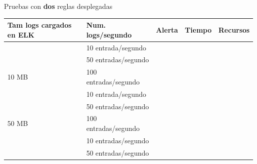 Pruebas con \textbf{dos} reglas desplegadas

\begin{table}[H]
\begin{tabular}{|l|l|l|l|l|}
\hline
\rowcolor[HTML]{ECF4FF} 
{\color[HTML]{000000} \textbf{Tam logs cargados en ELK}} & {\color[HTML]{000000} \textbf{Num. logs/segundo}} & {\color[HTML]{000000} \textbf{Alerta}} & {\color[HTML]{000000} \textbf{Tiempo}} & {\color[HTML]{000000} \textbf{Recursos}} \\ \hline
                                                         & 10 entrada/segundo                                &                                        &                                        &                                                 \\ \cline{2-5} 
                                                         & 50 entradas/segundo                               &                                        &                                        &                                                 \\ \cline{2-5} 
\multirow{-3}{*}{10 MB}                                  & 100 entradas/segundo                              &                                        &                                        &                                                 \\ \hline
                                                         & 10 entrada/segundo                                &                                        &                                        &                                                 \\ \cline{2-5} 
                                                         & 50 entradas/segundo                               &                                        &                                        &                                                 \\ \cline{2-5} 
\multirow{-3}{*}{50 MB}                                  & 100 entradas/segundo                              &                                        &                                        &                                                 \\ \hline
                                                         & 10 entradas/segundo                               &                                        &                                        &                                                 \\ \cline{2-5} 
                                                         & 50 entradas/segundo                               &                                        &                                        &                                                 \\ \cline{2-5} 

\end{tabular}
\end{table}
